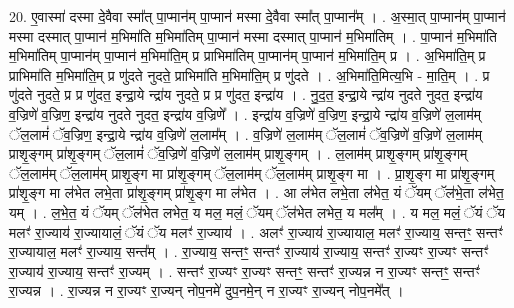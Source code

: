 \documentclass[17pt]{extarticle}
\begin{document}
20. ए॒वास्मा॑ दस्मा दे॒वैवा स्मा᳚त् पा॒प्मान॑म् पा॒प्मान॑ मस्मा दे॒वैवा स्मा᳚त् पा॒प्मान᳚म् । . अ॒स्मा॒त् पा॒प्मान॑म् पा॒प्मान॑ मस्मा दस्मात् पा॒प्मान॑ म॒भिमा॑ति म॒भिमा॑तिम् पा॒प्मान॑ मस्मा दस्मात् पा॒प्मान॑ म॒भिमा॑तिम् । . पा॒प्मान॑ म॒भिमा॑ति म॒भिमा॑तिम् पा॒प्मान॑म् पा॒प्मान॑ म॒भिमा॑ति॒म् प्र प्राभिमा॑तिम् पा॒प्मान॑म् पा॒प्मान॑ म॒भिमा॑ति॒म् प्र । . अ॒भिमा॑ति॒म् प्र प्राभिमा॑ति म॒भिमा॑ति॒म् प्र णु॑दते नुदते॒ प्राभिमा॑ति म॒भिमा॑ति॒म् प्र णु॑दते । . अ॒भिमा॑ति॒मित्य॒भि - मा॒ति॒म् । . प्र णु॑दते नुदते॒ प्र प्र णु॑दत॒ इन्द्रा॒ये न्द्रा॑य नुदते॒ प्र प्र णु॑दत॒ इन्द्रा॑य । . नु॒द॒त॒ इन्द्रा॒ये न्द्रा॑य नुदते नुदत॒ इन्द्रा॑य व॒ज्रिणे॑ व॒ज्रिण॒ इन्द्रा॑य नुदते नुदत॒ इन्द्रा॑य व॒ज्रिणे᳚ । . इन्द्रा॑य व॒ज्रिणे॑ व॒ज्रिण॒ इन्द्रा॒ये न्द्रा॑य व॒ज्रिणे॑ ल॒लाम॑म् ॅल॒लामं॑ ॅव॒ज्रिण॒ इन्द्रा॒ये न्द्रा॑य व॒ज्रिणे॑ ल॒लाम᳚म् । . व॒ज्रिणे॑ ल॒लाम॑म् ॅल॒लामं॑ ॅव॒ज्रिणे॑ व॒ज्रिणे॑ ल॒लाम॑म् प्राशृ॒ङ्गम् प्रा॑शृ॒ङ्गम् ॅल॒लामं॑ ॅव॒ज्रिणे॑ व॒ज्रिणे॑ ल॒लाम॑म् प्राशृ॒ङ्गम् । . ल॒लाम॑म् प्राशृ॒ङ्गम् प्रा॑शृ॒ङ्गम् ॅल॒लाम॑म् ॅल॒लाम॑म् प्राशृ॒ङ्ग मा प्रा॑शृ॒ङ्गम् ॅल॒लाम॑म् ॅल॒लाम॑म् प्राशृ॒ङ्ग मा । . प्रा॒शृ॒ङ्ग मा प्रा॑शृ॒ङ्गम् प्रा॑शृ॒ङ्ग मा ल॑भेत लभे॒ता प्रा॑शृ॒ङ्गम् प्रा॑शृ॒ङ्ग मा ल॑भेत । . आ ल॑भेत लभे॒ता ल॑भेत॒ यं ॅयम् ॅल॑भे॒ता ल॑भेत॒ यम् । . ल॒भे॒त॒ यं ॅयम् ॅल॑भेत लभेत॒ य मल॒ मलं॒ ॅयम् ॅल॑भेत लभेत॒ य मल᳚म् । . य मल॒ मलं॒ ॅयं ॅय मलꣳ॑ रा॒ज्याय॑ रा॒ज्यायालं॒ ॅयं ॅय मलꣳ॑ रा॒ज्याय॑ । . अलꣳ॑ रा॒ज्याय॑ रा॒ज्यायाल॒ मलꣳ॑ रा॒ज्याय॒ सन्तꣳ॒॒ सन्तꣳ॑ रा॒ज्यायाल॒ मलꣳ॑ रा॒ज्याय॒ सन्त᳚म् । . रा॒ज्याय॒ सन्तꣳ॒॒ सन्तꣳ॑ रा॒ज्याय॑ रा॒ज्याय॒ सन्तꣳ॑ रा॒ज्यꣳ रा॒ज्यꣳ सन्तꣳ॑ रा॒ज्याय॑ रा॒ज्याय॒ सन्तꣳ॑ रा॒ज्यम् । . सन्तꣳ॑ रा॒ज्यꣳ रा॒ज्यꣳ सन्तꣳ॒॒ सन्तꣳ॑ रा॒ज्यन्न न रा॒ज्यꣳ सन्तꣳ॒॒ सन्तꣳ॑ रा॒ज्यन्न । . रा॒ज्यन्न न रा॒ज्यꣳ रा॒ज्यन् नोप॒नमे॑ दुप॒नमे॒न् न रा॒ज्यꣳ रा॒ज्यन् नोप॒नमे᳚त् । \newline
\end{document}
